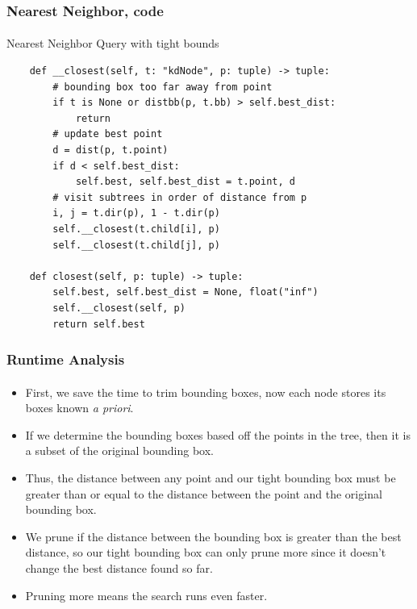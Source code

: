 \documentclass{beamer}                             %
\begin{document}
\begin{frame}[fragile]
\frametitle{Nearest Neighbor, code}
\framesubtitle{}
\begin{algorithm}[H]
  \caption{Nearest Neighbor Query with tight bounds}
  \begin{verbatim}
    def __closest(self, t: "kdNode", p: tuple) -> tuple:
        # bounding box too far away from point 
        if t is None or distbb(p, t.bb) > self.best_dist:
            return
        # update best point
        d = dist(p, t.point)
        if d < self.best_dist:
            self.best, self.best_dist = t.point, d
        # visit subtrees in order of distance from p
        i, j = t.dir(p), 1 - t.dir(p)
        self.__closest(t.child[i], p)
        self.__closest(t.child[j], p)

    def closest(self, p: tuple) -> tuple:
        self.best, self.best_dist = None, float("inf")
        self.__closest(self, p)
        return self.best
  \end{verbatim}
\end{algorithm}
\end{frame}

\begin{frame}
\frametitle{Runtime Analysis}
\framesubtitle{}
\begin{itemize}
  \item First, we save the time to trim bounding boxes, now
    each node stores its boxes known \textit{a priori}. \pause
  \item If we determine the bounding boxes based off the points in the tree,
    then it is a subset of the original bounding box.
  \item Thus, the distance between any point and our
    tight bounding box must be greater than or equal to the
    distance between the point and the original bounding box.
  \item We prune if the distance between the bounding box is greater
    than the best distance, so our tight bounding box can only prune more
    since it doesn't change the best distance found so far.
  \item Pruning more means the search runs even faster.
\end{itemize}
\end{frame}
\end{document}
